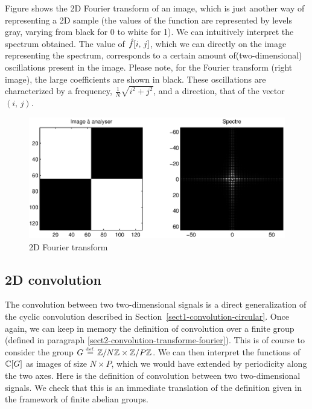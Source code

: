  
 Figure  shows the 2D Fourier transform of an image, which is just another way of representing a 2D sample (the values of the function are represented by levels gray, varying from black for 0 to white for 1). We can intuitively interpret the spectrum obtained. The value of $ \hat{f}[i, \, j] $, which we can  directly on the image representing the spectrum, corresponds to a certain amount of(two-dimensional) oscillations present in the image. Please note, for the Fourier transform (right image), the large coefficients are shown in black. These oscillations are characterized by a frequency, $ \frac{1}{N} \sqrt{i^2 + j^2} $, and a direction, that of the vector $ (i, \, j) $. 
	\begin{figure}[ht]
    \begin{center}
    \includegraphics [scale = 0.6]{images/tfd-2d.eps}
    \end{center}
    \caption{2D Fourier transform}
              \label{fig-tfd-2d}
\end{figure}
 
\subsection{2D convolution}
\label{sect2-convolution-2d} 
 
 
 The convolution between two two-dimensional signals is a direct generalization of the cyclic convolution described in Section~\ref{sect1-convolution-circular}. Once again, we can keep in memory the definition of convolution over a finite group (defined in paragraph \ref{sect2-convolution-transforme-fourier}). This is of course to consider the group $ G \stackrel{\mbox{\upshape\tiny def.}}{=} \mathbb{Z}/N \mathbb{Z} \times \mathbb{Z}/P \mathbb{Z} $. We can then interpret the functions of $ \mathbb{C} [G] $ as images of size $ N \times P $, which we would have extended by periodicity along the two axes. Here is the definition of convolution between two two-dimensional signals. We check that this is an immediate translation of the definition given in the framework of finite abelian groups.
 
